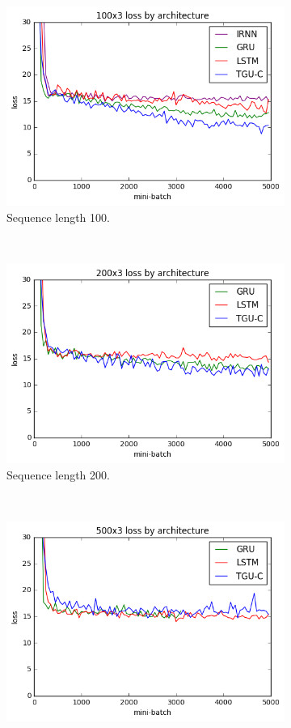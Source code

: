 \begin{figure}[p]
\begin{subfigure}[t]{0.3\linewidth}
	\includegraphics[width=\linewidth]{exps/vbind/plots/100x3}
	\caption{Sequence length 100.}
\end{subfigure}~
\begin{subfigure}[t]{0.3\linewidth}
	\includegraphics[width=\linewidth]{exps/vbind/plots/200x3}
	\caption{Sequence length 200.}
\end{subfigure}~
\begin{subfigure}[t]{0.3\linewidth}
	\includegraphics[width=\linewidth]{exps/vbind/plots/500x3}

\end{subfigure}
\end{figure}
